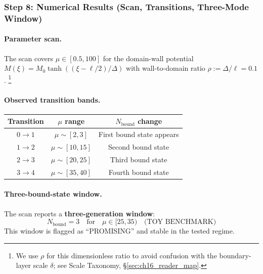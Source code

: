 \subsubsection{Step 8: Numerical Results (Scan, Transitions, Three-Mode Window)}
\label{subsubsec:opr21_step8}

\paragraph{Parameter scan.}
The scan covers $\mu \in [0.5, 100]$ for the domain-wall potential
$M(\xi) = M_0 \tanh((\xi - \ell/2)/\Delta)$ with wall-to-domain ratio
$\rho := \Delta/\ell = 0.1$.%
\footnote{We use $\rho$ for this dimensionless ratio to avoid confusion with
the boundary-layer scale $\delta$; see Scale Taxonomy, \S\ref{sec:ch16_reader_map}.}

\paragraph{Observed transition bands.}
\begin{center}
\begin{tabular}{ccc}
\toprule
\textbf{Transition} & \textbf{$\mu$ range} & \textbf{$N_{\text{bound}}$ change} \\
\midrule
$0 \to 1$ & $\mu \sim [2, 3]$ & First bound state appears \\
$1 \to 2$ & $\mu \sim [10, 15]$ & Second bound state \\
$2 \to 3$ & $\mu \sim [20, 25]$ & Third bound state \\
$3 \to 4$ & $\mu \sim [35, 40]$ & Fourth bound state \\
\bottomrule
\end{tabular}
\end{center}

\paragraph{Three-bound-state window.}
The scan reports a \textbf{three-generation window}:
\begin{equation}
    \boxed{N_{\text{bound}} = 3 \quad \text{for} \quad \mu \in [25, 35) \quad \text{(TOY BENCHMARK)}}
    \label{eq:opr21:three_gen_window}
\end{equation}
This window is flagged as ``PROMISING'' and stable in the tested regime.

